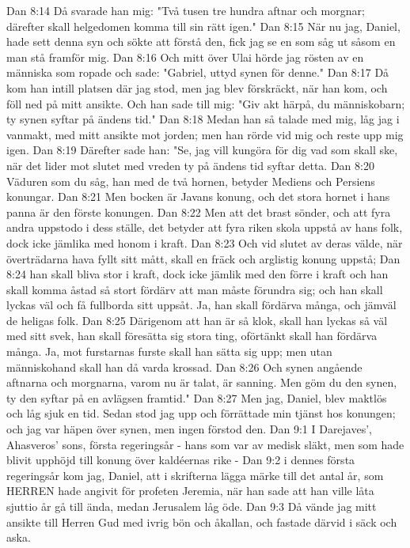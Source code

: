 Dan 8:14  Då svarade han mig: "Två tusen tre hundra aftnar och morgnar; därefter skall helgedomen komma till sin rätt igen."
Dan 8:15  När nu jag, Daniel, hade sett denna syn och sökte att förstå den, fick jag se en som såg ut såsom en man stå framför mig.
Dan 8:16  Och mitt över Ulai hörde jag rösten av en människa som ropade och sade: "Gabriel, uttyd synen för denne."
Dan 8:17  Då kom han intill platsen där jag stod, men jag blev förskräckt, när han kom, och föll ned på mitt ansikte. Och han sade till mig: "Giv akt härpå, du människobarn; ty synen syftar på ändens tid."
Dan 8:18  Medan han så talade med mig, låg jag i vanmakt, med mitt ansikte mot jorden; men han rörde vid mig och reste upp mig igen.
Dan 8:19  Därefter sade han: "Se, jag vill kungöra för dig vad som skall ske, när det lider mot slutet med vreden ty på ändens tid syftar detta.
Dan 8:20  Väduren som du såg, han med de två hornen, betyder Mediens och Persiens konungar.
Dan 8:21  Men bocken är Javans konung, och det stora hornet i hans panna är den förste konungen.
Dan 8:22  Men att det brast sönder, och att fyra andra uppstodo i dess ställe, det betyder att fyra riken skola uppstå av hans folk, dock icke jämlika med honom i kraft.
Dan 8:23  Och vid slutet av deras välde, när överträdarna hava fyllt sitt mått, skall en fräck och arglistig konung uppstå;
Dan 8:24  han skall bliva stor i kraft, dock icke jämlik med den förre i kraft och han skall komma åstad så stort fördärv att man måste förundra sig; och han skall lyckas väl och få fullborda sitt uppsåt. Ja, han skall fördärva många, och jämväl de heligas folk.
Dan 8:25  Därigenom att han är så klok, skall han lyckas så väl med sitt svek, han skall föresätta sig stora ting, oförtänkt skall han fördärva många. Ja, mot furstarnas furste skall han sätta sig upp; men utan människohand skall han då varda krossad.
Dan 8:26  Och synen angående aftnarna och morgnarna, varom nu är talat, är sanning. Men göm du den synen, ty den syftar på en avlägsen framtid."
Dan 8:27  Men jag, Daniel, blev maktlös och låg sjuk en tid. Sedan stod jag upp och förrättade min tjänst hos konungen; och jag var häpen över synen, men ingen förstod den.
Dan 9:1  I Darejaves', Ahasveros' sons, första regeringsår - hans som var av medisk släkt, men som hade blivit upphöjd till konung över kaldéernas rike -
Dan 9:2  i dennes första regeringsår kom jag, Daniel, att i skrifterna lägga märke till det antal år, som HERREN hade angivit för profeten Jeremia, när han sade att han ville låta sjuttio år gå till ända, medan Jerusalem låg öde.
Dan 9:3  Då vände jag mitt ansikte till Herren Gud med ivrig bön och åkallan, och fastade därvid i säck och aska.
